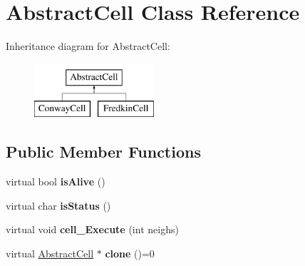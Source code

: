 \hypertarget{classAbstractCell}{\section{Abstract\-Cell Class Reference}
\label{classAbstractCell}
}
Inheritance diagram for Abstract\-Cell\-:\begin{figure}[H]
\begin{center}
\leavevmode
\includegraphics[height=2.000000cm]{classAbstractCell}
\end{center}
\end{figure}
\subsection*{Public Member Functions}
\begin{DoxyCompactItemize}
\item 
\hypertarget{classAbstractCell_ad799e7d9fed29d098293c76ac1dad5bb}{virtual bool {\bfseries is\-Alive} ()}\label{classAbstractCell_ad799e7d9fed29d098293c76ac1dad5bb}

\item 
\hypertarget{classAbstractCell_ae54b20831f27b0e867e68772f51b56c9}{virtual char {\bfseries is\-Status} ()}\label{classAbstractCell_ae54b20831f27b0e867e68772f51b56c9}

\item 
\hypertarget{classAbstractCell_a7f11cb2246a9360376a3c2b0bef3f97f}{virtual void {\bfseries cell\-\_\-\-Execute} (int neighs)}\label{classAbstractCell_a7f11cb2246a9360376a3c2b0bef3f97f}

\item 
\hypertarget{classAbstractCell_a6fd8f93b5a1547280fec2cb74241af38}{virtual \hyperlink{classAbstractCell}{Abstract\-Cell} $\ast$ {\bfseries clone} ()=0}\label{classAbstractCell_a6fd8f93b5a1547280fec2cb74241af38}

\end{DoxyCompactItemize}
